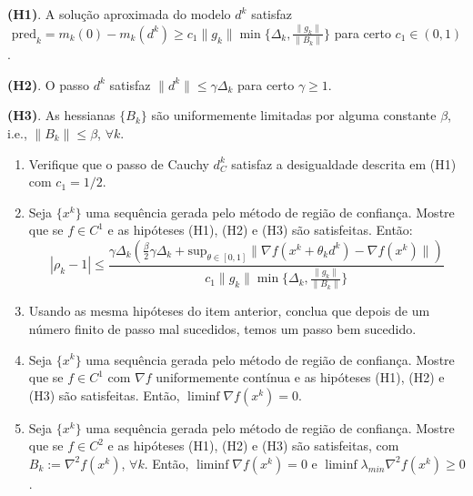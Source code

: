 \documentclass[a4paper,latin]{article}
\begin{document}
\begin{enumerate}
      {\bf (H1)}. A solução aproximada do modelo $d^{k}$
      satisfaz 
       $ 
      \text{ pred}_{k}=m_{k}(0)-m_{k}(d^{k}) \geq 
      c_1 \|g_k\|
      \min \{ \Delta_k, \frac{\|g_{k}\|}{\|B_k\|} \}
      $ para certo $c_1 \in (0,1)$.
      
      {\bf (H2)}. O passo $d^{k}$ satisfaz $\|d^k\|\leq \gamma \Delta_k$ para certo 
      	$\gamma\geq 1$.
      
      {\bf (H3)}. As hessianas $\{B_k\}$ são uniformemente limitadas por alguma constante $\beta$, i.e., $\|B_k\|\leq \beta$, $\forall k$. 
      	
         \begin{enumerate}
    	  \item Verifique que o passo de Cauchy 
    	$d_{C}^{k}$ satisfaz a desigualdade
    	   descrita em (H1) 
    	   com $c_{1}=1/2$. 
    	  \item Seja 
    	  $\{x^k\}$ uma sequência gerada pelo método de região de confiança.
    	  Mostre que se $f \in C^{1}$ e as hipóteses 
    	  (H1), (H2)
    	  e (H3) são satisfeitas. Então:
    	  $$
    	  |\rho_k-1|
    	  \leq 
   \frac{\gamma\Delta_{k}\left(\frac{\beta}{2}\gamma \Delta_k+\text{sup}_{\theta \in [0,1]}
    	  \|\nabla f(x^k+\theta_kd^k)
    	  -\nabla f(x^k)\|\right)}
    	  {c_1 \|g_k\| \min \{ \Delta_k, \frac{\|g_{k}\|}{\|B_k\|}\}}$$
    	  \item Usando  as mesma hipóteses do item anterior, conclua que 
    	  depois de um número finito de passo mal sucedidos, temos um passo bem sucedido. 
    	  \item   Seja 
    	  $\{x^k\}$ uma sequência gerada pelo método de região de confiança.
    	  Mostre que se $f \in C^{1}$ com $\nabla f$ uniformemente contínua e as hipóteses 
    	  (H1), (H2)
    	  e (H3) são satisfeitas. Então, $\liminf \nabla f(x^k)=0$.
    	  \item Seja 
    	  $\{x^k\}$ uma sequência gerada pelo método de região de confiança.
    	  Mostre que se $f \in C^{2}$ e as hipóteses 
    	  (H1), (H2)
    	  e (H3) são satisfeitas, com $B_{k}:=\nabla^2 f(x^k)$, $\forall k$.
    	  Então,  $\liminf \nabla f(x^k)=0$ e 
    	  $\liminf \lambda_{min}\nabla^{2} f(x^k)\geq 0$.
         \end{enumerate}
    \end{enumerate}
\end{document}
